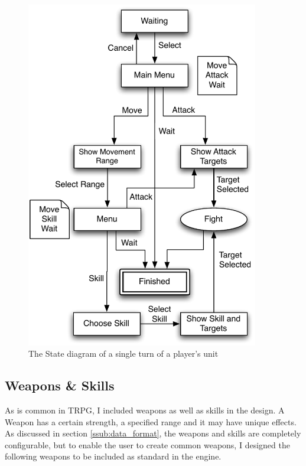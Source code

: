 \begin{figure}[h]
	\centering
		\includegraphics[width=4in]{figures/unit.pdf}
	\caption{The State diagram of a single turn of a player's unit}
	\label{fig:figures_unit}
\end{figure}

\clearpage
\subsection{Weapons \& Skills}
\label{sub:weapons___skills}



As is common in TRPG, I included weapons as  well as skills in the design.  A Weapon has a certain strength, a specified range and it may have unique effects.  As discussed in  section \ref{ssub:data_format},  the weapons and skills are completely configurable, but to enable the user to create common weapons, I designed the following weapons to be included as standard in the engine.  

